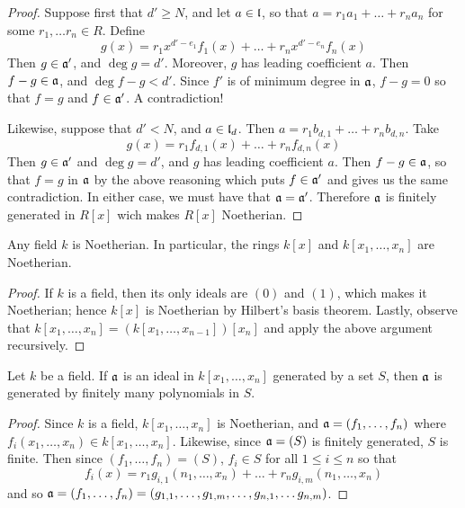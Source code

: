 \begin{proof}
  Suppose first that $d' \geq N$, and let $a \in \mathfrak{l}$, so that
  $a=r_1a_1+\dots+r_na_n$ for some $r_1, \dots r_n \in R$. Define
  \begin{equation*}
    g(x)=r_1x^{d'-e_1}f_1(x)+\dots+r_nx^{d'-e_n}f_n(x)
  \end{equation*}
  Then $g \in \mathfrak{a}'$, and $\deg{g}=d'$. Moreover, $g$ has leading
  coefficient $a$. Then $f-g \in \mathfrak{a}$, and $\deg{f-g}<d'$. Since $f'$ is
  of minimum degree in  $\mathfrak{a}$, $f-g=0$ so that  $f=g$ and  $f \in
  \mathfrak{a}'$. A contradiction!

  Likewise, suppose that $d'<N$, and  $a \in \mathfrak{l}_d$. Then
  $a=r_1b_{d,1}+\dots+r_nb_{d,n}$. Take
  \begin{equation*}
    g(x)=r_1f_{d,1}(x)+\dots+r_nf_{d,n}(x)
  \end{equation*}
  Then $g \in \mathfrak{a}'$ and $\deg{g}=d'$, and $g$ has leading coefficient
  $a$. Then $f-g \in \mathfrak{a}$, so that $f=g$ in $\mathfrak{a}$ by the above
  reasoning which puts  $f \in \mathfrak{a}'$ and gives us the same
  contradiction. In either case, we must have that $\mathfrak{a}=\mathfrak{a}'$.
  Therefore $\mathfrak{a}$ is finitely generated in $R[x]$ wich makes $R[x]$
  Noetherian.
\end{proof}
\begin{corollary}
  Any field $k$ is Noetherian. In particular, the rings $k[x]$ and
  $k[x_1, \dots, x_n]$ are Noetherian.
\end{corollary}
\begin{proof}
  If $k$ is a field, then its only ideals are $(0)$ and $(1)$, which
  makes it Noetherian; hence $k[x]$ is Noetherian by Hilbert's basis
  theorem. Lastly, observe that $k[x_1, \dots, x_n]=(k[x_1, \dots,
  x_{n-1}])[x_n]$ and apply the above argument recursively.
\end{proof}
\begin{corollary}
  Let $k$ be a field. If $\mathfrak{a}$ is an ideal in $k[x_1, \dots, x_n]$ generated
  by a set $S$, then $\mathfrak{a}$ is generated by finitely many polynomials in $S$.
\end{corollary}
\begin{proof}
  Since $k$ is a field, $k[x_1, \dots, x_n]$ is Noetherian, and
  $\mathfrak{a}=(f_1, \dots, f_n)$ where $f_i(x_1, \dots ,x_n) \in k[x_1,
  \dots, x_n]$. Likewise, since $\mathfrak{a}=(S)$ is finitely generated, $S$
  is finite. Then since $(f_1, \dots, f_n)=(S)$, $f_i \in S$ for all
  $1 \leq i \leq n$ so that
  \begin{equation*}
    f_i(x)=r_1g_{i,1}(n_1, \dots, x_n)+\dots+r_ng_{i,m}(n_1, \dots, x_n)
  \end{equation*}
  and so $\mathfrak{a}=(f_1, \dots, f_n)=(g_{1,1}, \dots ,g_{1,m}, \dots,
  g_{n,1}, \dots g_{n,m})$.
\end{proof}

